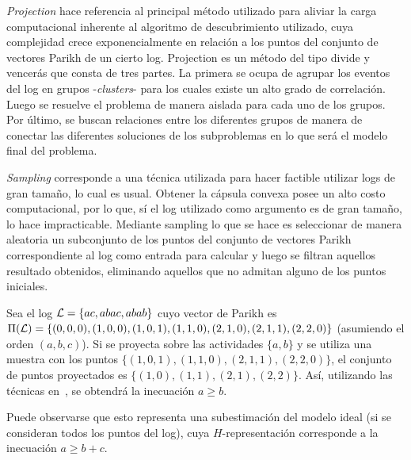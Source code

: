 \begin{remark}[Projection]
    \textit{Projection} hace referencia al principal método utilizado para aliviar la carga
    computacional inherente al algoritmo de descubrimiento utilizado, cuya complejidad
    crece exponencialmente en relación a los puntos del conjunto de vectores Parikh de un cierto
    log. Projection es un método del tipo divide y vencerás que consta de tres partes. 
    La primera se ocupa de agrupar los eventos del log en grupos -\textit{clusters}-
    para los cuales existe un alto grado de correlación. 
    Luego se resuelve el problema de manera aislada para cada uno de los grupos.
    Por último, se buscan relaciones entre los diferentes grupos de manera de 
    conectar las diferentes soluciones de los subproblemas en lo que será
    el modelo final del problema.
\end{remark}

\begin{remark}[Sampling]
    \textit{Sampling} corresponde a una técnica utilizada para hacer factible utilizar
    logs de gran tamaño, lo cual es usual.
    Obtener la cápsula convexa posee un alto costo computacional, por lo que, sí el log utilizado
    como argumento es de gran tamaño, lo hace impracticable.
    Mediante sampling lo que se hace es seleccionar de manera aleatoria un subconjunto de los
    puntos del conjunto de vectores Parikh correspondiente al log como entrada para calcular y 
    luego se filtran aquellos resultado obtenidos, eliminando aquellos que no admitan alguno 
    de los puntos iniciales.
\end{remark}

\begin{example}
    Sea el log ${\mathcal L}=\{ ac, abac, abab \}$ cuyo vector de Parikh es 
    $\Pi({\mathcal L})=\{ (0,0,0),(1,0,0), (1,0,1),(1,1,0), (2,1,0), (2,1,1),(2,2,0) \}$ (asumiendo el orden $(a,b,c)$).
    Si se proyecta sobre las actividades $\{a,b\}$ y se utiliza una muestra con los puntos
    $\{(1,0,1),(1,1,0),(2,1,1),(2,2,0)\}$, el conjunto de puntos proyectados es
    $\{ (1,0), (1,1), (2,1), (2,2) \}$. 
    Así, utilizando las técnicas en~\cite{CarmonaC14}, se obtendrá la inecuación
    \mbox{$a \ge b$}.
    
    Puede observarse que esto representa una subestimación del modelo ideal (si se consideran
    todos los puntos del log), cuya $H$-representación corresponde a la inecuación $a \ge b + c$.
\end{example}


